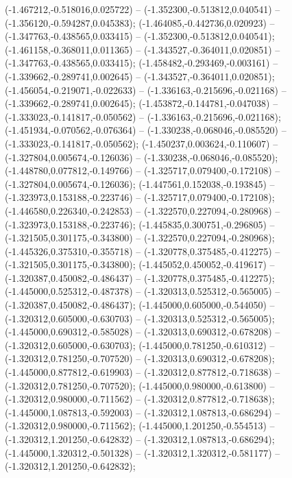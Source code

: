  (-1.467212,-0.518016,0.025722) -- (-1.352300,-0.513812,0.040541) -- (-1.356120,-0.594287,0.045383);
 (-1.464085,-0.442736,0.020923) -- (-1.347763,-0.438565,0.033415) -- (-1.352300,-0.513812,0.040541);
 (-1.461158,-0.368011,0.011365) -- (-1.343527,-0.364011,0.020851) -- (-1.347763,-0.438565,0.033415);
 (-1.458482,-0.293469,-0.003161) -- (-1.339662,-0.289741,0.002645) -- (-1.343527,-0.364011,0.020851);
 (-1.456054,-0.219071,-0.022633) -- (-1.336163,-0.215696,-0.021168) -- (-1.339662,-0.289741,0.002645);
 (-1.453872,-0.144781,-0.047038) -- (-1.333023,-0.141817,-0.050562) -- (-1.336163,-0.215696,-0.021168);
 (-1.451934,-0.070562,-0.076364) -- (-1.330238,-0.068046,-0.085520) -- (-1.333023,-0.141817,-0.050562);
 (-1.450237,0.003624,-0.110607) -- (-1.327804,0.005674,-0.126036) -- (-1.330238,-0.068046,-0.085520);
 (-1.448780,0.077812,-0.149766) -- (-1.325717,0.079400,-0.172108) -- (-1.327804,0.005674,-0.126036);
 (-1.447561,0.152038,-0.193845) -- (-1.323973,0.153188,-0.223746) -- (-1.325717,0.079400,-0.172108);
 (-1.446580,0.226340,-0.242853) -- (-1.322570,0.227094,-0.280968) -- (-1.323973,0.153188,-0.223746);
 (-1.445835,0.300751,-0.296805) -- (-1.321505,0.301175,-0.343800) -- (-1.322570,0.227094,-0.280968);
 (-1.445326,0.375310,-0.355718) -- (-1.320778,0.375485,-0.412275) -- (-1.321505,0.301175,-0.343800);
 (-1.445052,0.450052,-0.419617) -- (-1.320387,0.450082,-0.486437) -- (-1.320778,0.375485,-0.412275);
 (-1.445000,0.525312,-0.487378) -- (-1.320313,0.525312,-0.565005) -- (-1.320387,0.450082,-0.486437);
 (-1.445000,0.605000,-0.544050) -- (-1.320312,0.605000,-0.630703) -- (-1.320313,0.525312,-0.565005);
 (-1.445000,0.690312,-0.585028) -- (-1.320313,0.690312,-0.678208) -- (-1.320312,0.605000,-0.630703);
 (-1.445000,0.781250,-0.610312) -- (-1.320312,0.781250,-0.707520) -- (-1.320313,0.690312,-0.678208);
 (-1.445000,0.877812,-0.619903) -- (-1.320312,0.877812,-0.718638) -- (-1.320312,0.781250,-0.707520);
 (-1.445000,0.980000,-0.613800) -- (-1.320312,0.980000,-0.711562) -- (-1.320312,0.877812,-0.718638);
 (-1.445000,1.087813,-0.592003) -- (-1.320312,1.087813,-0.686294) -- (-1.320312,0.980000,-0.711562);
 (-1.445000,1.201250,-0.554513) -- (-1.320312,1.201250,-0.642832) -- (-1.320312,1.087813,-0.686294);
 (-1.445000,1.320312,-0.501328) -- (-1.320312,1.320312,-0.581177) -- (-1.320312,1.201250,-0.642832);
